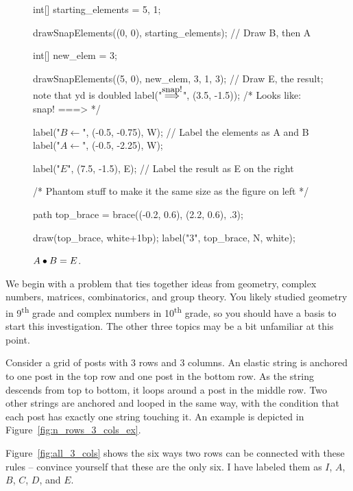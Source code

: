 \documentclass[../gatm.tex]{subfiles}
\begin{document}
\begin{figure}[h]
\begin{minipage}{.45\textwidth}
\begin{center}
\begin{asy}[width=\textwidth]
				int[] starting_elements = {5, 1};

				drawSnapElements((0, 0), starting_elements); // Draw B, then A

				int[] new_elem = {3};

				drawSnapElements((5, 0), new_elem, 3, 1, 3); // Draw E, the result; note that yd is doubled
				label("$\stackrel{\mbox{\small snap!}}{\Longrightarrow}$", (3.5, -1.5));
				/* Looks like:
				snap!
				===>  */

				label("$B \leftarrow$", (-0.5, -0.75), W); // Label the elements as A and B
				label("$A \leftarrow$", (-0.5, -2.25), W);

				label("$E$", (7.5, -1.5), E); // Label the result as E on the right

				/* Phantom stuff to make it the same size as the figure on left */

				path top_brace = brace((-0.2, 0.6), (2.2, 0.6), .3);

				draw(top_brace, white+1bp);
				label("$3$", top_brace, N, white);
			\end{asy}

			\caption{$A\bullet B = E$.}
			\label{fig:snap_ex}
		\end{center}
	\end{minipage}
\end{figure}


\noindent We begin with a problem that ties together ideas from geometry, complex numbers, matrices, combinatorics, and group theory.
You likely studied geometry in 9\textsuperscript{th} grade and complex numbers in 10\textsuperscript{th} grade, so you should have a basis to start this investigation.
The other three topics may be a bit unfamiliar at this point.

Consider a grid of posts with $3$ rows and $3$ columns.
An elastic string is anchored to one post in the top row and one post in the bottom row.
As the string descends from top to bottom, it loops around a post in the middle row.
Two other strings are anchored and looped in the same way, with the condition that each post has exactly one string touching it.
An example is depicted in Figure~\ref{fig:n_rows_3_cols_ex}.

Figure~\ref{fig:all_3_cols} shows the six ways two rows can be connected with these rules -- convince yourself that these are the only six.
I have labeled them as $I$, $A$, $B$, $C$, $D$, and $E$.
\end{document}
